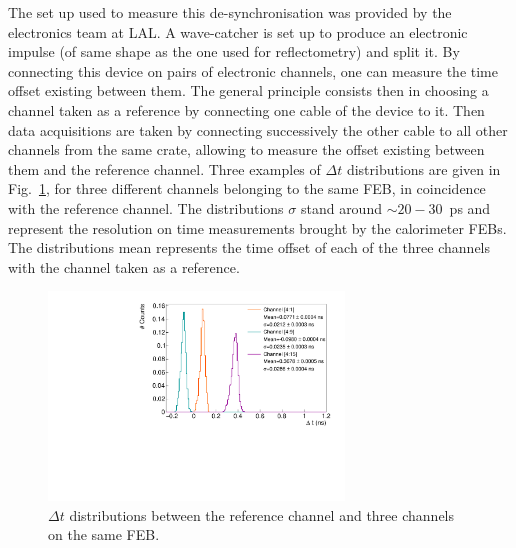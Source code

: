 The set up used to measure this de-synchronisation was provided by the electronics team at LAL.
A wave-catcher is set up to produce an electronic impulse (of same shape as the one used for reflectometry) and split it.
By connecting this device on pairs of electronic channels, one can measure the time offset existing between them.
The general principle consists then in choosing a channel taken as a reference by connecting one cable of the device to it.
Then data acquisitions are taken by connecting successively the other cable to all other channels from the same crate, allowing to measure the offset existing between them and the reference channel.
Three examples of $\Delta t$ distributions are given in Fig.~\ref{fig:FEB_offset}, for three different channels belonging to the same FEB, in coincidence with the reference channel.
The distributions $\sigma$ stand around $\sim20-30$~ps and represent the resolution on time measurements brought by the calorimeter FEBs.
The distributions mean represents the time offset of each of the three channels with the channel taken as a reference.
\begin{figure}[h!]
  \centering
  \includegraphics[width=0.7\textwidth]{commissioning/fig_commissioning/time_offset.pdf}
  \caption{$\Delta t$ distributions between the reference channel and three channels on the same FEB.
    \label{fig:FEB_offset}}
\end{figure}

